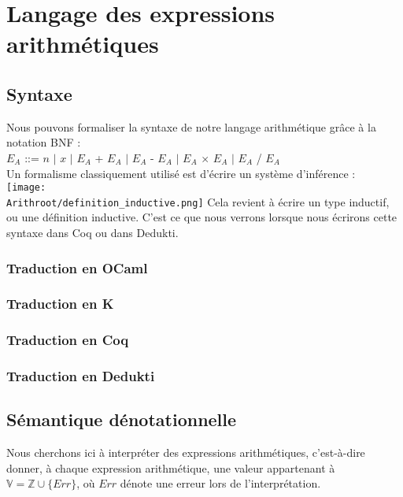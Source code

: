 
\chapter{Langage des expressions arithmétiques}

	\section{Syntaxe}

Nous pouvons formaliser la syntaxe de notre langage arithmétique grâce à la notation BNF : \\
$E_A$ ::= $n$ $|$ $x$ $|$ $E_A$ + $E_A$ $|$ $E_A$ - $E_A$ $|$ $E_A$ $\times$ $E_A$ $|$ $E_A$ / $E_A$ 
\vspace{1\baselineskip} \\
Un formalisme classiquement utilisé est d'écrire un système d'inférence : \\
\texttt{[image: \\Arithroot/definition\_inductive.png]}
Cela revient à écrire un type inductif, ou une définition inductive. C'est ce que nous verrons lorsque nous écrirons cette syntaxe dans Coq ou dans Dedukti.

	\subsection{Traduction en OCaml}
	
	
	\subsection{Traduction en K}
	

	\subsection{Traduction en Coq}
	\subsection{Traduction en Dedukti}


\section{Sémantique dénotationnelle}
Nous cherchons ici à interpréter des expressions arithmétiques, c'est-à-dire donner, à chaque expression arithmétique, une valeur appartenant à $\mathbb{V} = \mathbb{Z} \cup \{ Err \}$, où $Err$ dénote une erreur lors de l’interprétation.

